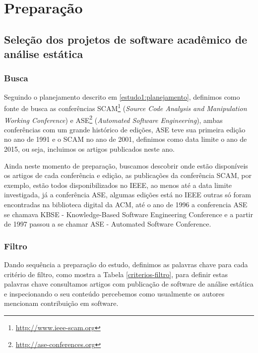 
\section{Preparação} \label{estudo1:preparacao}

\subsection{Seleção dos projetos de software acadêmico de análise estática} %

\subsubsection{Busca}

Seguindo o planejamento descrito em \ref{estudo1:planejamento}, definimos como
fonte de busca as conferências SCAM\footnote{\url{http://www.ieee-scam.org}}
({\it Source Code Analysis and Manipulation Working Conference}) e
ASE\footnote{\url{http://ase-conferences.org}} ({\it Automated Software
Engineering}), ambas conferências com um grande histórico de edições, ASE teve
sua primeira edição no ano de 1991 e o SCAM no ano de 2001, definimos como data
limite o ano de 2015, ou seja, incluimos os artigos publicados neste ano.

Ainda neste momento de preparação, buscamos descobrir onde estão disponíveis os
artigos de cada conferência e edição, as publicações da conferência SCAM, por
exemplo, estão todos disponibilizados no IEEE, ao menos até a data limite
investigada, já a conferência ASE, algumas edições está no IEEE outras só foram
encontradas na biblioteca digital da ACM, até o ano de 1996 a conferencia ASE
se chamava KBSE - Knowledge-Based Software Engineering Conference e a partir de
1997 passou a se chamar ASE - Automated Software Conference.

\subsubsection{Filtro}

Dando sequência a preparação do estudo, definimos as palavras chave para cada
critério de filtro, como mostra a Tabela \ref{criterios-filtro}, para definir
estas palavras chave consultamos artigos com publicação de software de análise
estática e inspecionando o seu conteúdo percebemos como usualmente os
autores mencionam contribuição em software.

